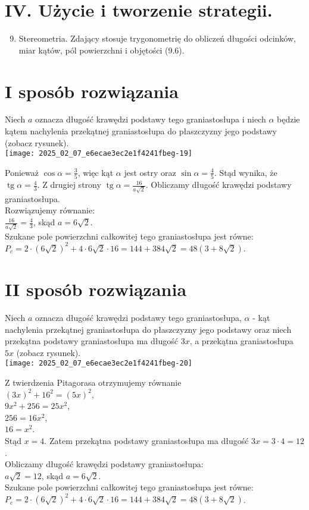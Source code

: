 \documentclass[10pt]{article}
\begin{document}
\section*{IV. Użycie i tworzenie strategii.}
\begin{enumerate}
  \setcounter{enumi}{8}
  \item Stereometria. Zdający stosuje trygonometrię do obliczeń długości odcinków, miar kątów, pól powierzchni i objętości (9.6).
\end{enumerate}

\section*{I sposób rozwiązania}
Niech $a$ oznacza długość krawędzi podstawy tego graniastosłupa i niech $\alpha$ będzie kątem nachylenia przekątnej graniastosłupa do płaszczyzny jego podstawy (zobacz rysunek).\\
\texttt{[image: 2025\_02\_07\_e6ecae3ec2e1f4241fbeg-19]}

Ponieważ $\cos \alpha=\frac{3}{5}$, więc kąt $\alpha$ jest ostry oraz $\sin \alpha=\frac{4}{5}$. Stąd wynika, że $\operatorname{tg} \alpha=\frac{4}{3}$. Z drugiej strony $\operatorname{tg} \alpha=\frac{16}{a \sqrt{2}}$. Obliczamy długość krawędzi podstawy graniastosłupa.\\
Rozwiązujemy równanie:\\
$\frac{16}{a \sqrt{2}}=\frac{4}{3}$, skąd $a=6 \sqrt{2}$.\\
Szukane pole powierzchni całkowitej tego graniastosłupa jest równe:\\
$P_{c}=2 \cdot(6 \sqrt{2})^{2}+4 \cdot 6 \sqrt{2} \cdot 16=144+384 \sqrt{2}=48(3+8 \sqrt{2})$.

\section*{II sposób rozwiązania}
Niech $a$ oznacza długość krawędzi podstawy tego graniastosłupa, $\alpha$ - kąt nachylenia przekątnej graniastosłupa do płaszczyzny jego podstawy oraz niech przekątna podstawy graniastosłupa ma długość $3 x$, a przekątna graniastosłupa $5 x$ (zobacz rysunek).\\
\texttt{[image: 2025\_02\_07\_e6ecae3ec2e1f4241fbeg-20]}

Z twierdzenia Pitagorasa otrzymujemy równanie\\
$(3 x)^{2}+16^{2}=(5 x)^{2}$,\\
$9 x^{2}+256=25 x^{2}$,\\
$256=16 x^{2}$,\\
$16=x^{2}$.\\
Stąd $x=4$. Zatem przekątna podstawy graniastosłupa ma długość $3 x=3 \cdot 4=12$.\\
Obliczamy długość krawędzi podstawy graniastosłupa:\\
$a \sqrt{2}=12$, skąd $a=6 \sqrt{2}$.\\
Szukane pole powierzchni całkowitej tego graniastosłupa jest równe:\\
$P_{c}=2 \cdot(6 \sqrt{2})^{2}+4 \cdot 6 \sqrt{2} \cdot 16=144+384 \sqrt{2}=48(3+8 \sqrt{2})$.
\end{document}
